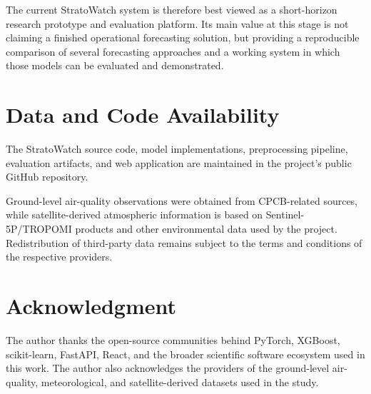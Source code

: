 \documentclass[conference]{IEEEtran}
\begin{document}
The current StratoWatch system is therefore best viewed as a short-horizon research prototype
and evaluation platform. Its main value at this stage is not claiming a finished operational
forecasting solution, but providing a reproducible comparison of several forecasting
approaches and a working system in which those models can be evaluated and demonstrated.

\section*{Data and Code Availability}

The StratoWatch source code, model implementations, preprocessing pipeline, evaluation
artifacts, and web application are maintained in the project's public GitHub repository.

Ground-level air-quality observations were obtained from CPCB-related sources, while
satellite-derived atmospheric information is based on Sentinel-5P/TROPOMI products and other
environmental data used by the project. Redistribution of third-party data remains subject
to the terms and conditions of the respective providers.

\section*{Acknowledgment}

The author thanks the open-source communities behind PyTorch, XGBoost, scikit-learn,
FastAPI, React, and the broader scientific software ecosystem used in this work. The author
also acknowledges the providers of the ground-level air-quality, meteorological, and
satellite-derived datasets used in the study.

\end{document}
